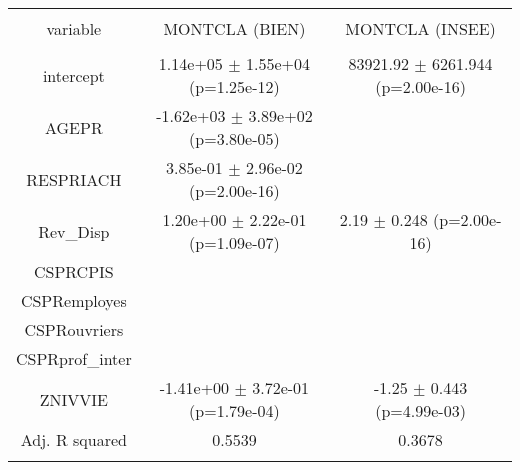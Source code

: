 \documentclass{article}
\begin{document}
\begin{table*}[!htbp] \centering 
  \caption{} 
  \label{} 
\begin{tabular}{@{\extracolsep{5pt}} ccc} 
\\[-1.8ex]\hline 
\hline \\[-1.8ex] 
variable & MONTCLA (BIEN) & MONTCLA (INSEE) \\ 
\hline \\[-1.8ex] 
intercept &  1.14e+05 $\pm$ 1.55e+04 (p=1.25e-12) & 83921.92 $\pm$ 6261.944 (p=2.00e-16) \\ 
AGEPR & -1.62e+03 $\pm$ 3.89e+02 (p=3.80e-05) &  \\ 
RESPRIACH &  3.85e-01 $\pm$ 2.96e-02 (p=2.00e-16) &  \\ 
Rev\_Disp &  1.20e+00 $\pm$ 2.22e-01 (p=1.09e-07) &     2.19 $\pm$    0.248 (p=2.00e-16) \\ 
CSPRCPIS &  &  \\ 
CSPRemployes &  &  \\ 
CSPRouvriers &  &  \\ 
CSPRprof\_inter &  &  \\ 
ZNIVVIE & -1.41e+00 $\pm$ 3.72e-01 (p=1.79e-04) &    -1.25 $\pm$    0.443 (p=4.99e-03) \\ 
\hline Adj. R squared & 0.5539 & 0.3678 \\ 
\hline \\[-1.8ex] 
\end{tabular} 
\end{table*}
\end{document}
